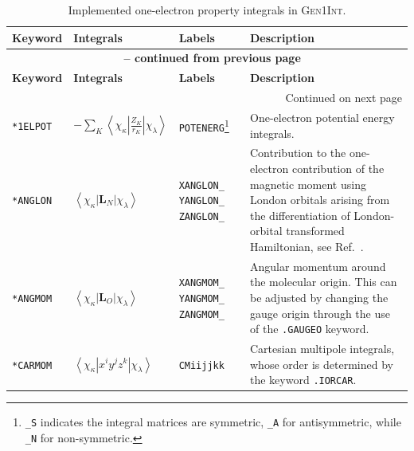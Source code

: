 \documentclass[a4paper,11pt,twoside,openright]{book}
\newcommand{\propint}[1]{\left\langle\chi_{\kappa}\left|#1\right|\chi_{\lambda}\right\rangle}
\begin{document}
\begin{landscape}

\begin{center}

\begin{longtable}{p{1.8cm}|p{6.5cm}|p{2.2cm}|p{11cm}}
  \caption{Implemented one-electron property integrals in \textsc{Gen1Int}.}
  \label{tab:def-prop}\\
  \hline\hline
  \textbf{Keyword} & \textbf{Integrals} & \textbf{Labels} & \textbf{Description}\\
  \hline
  \endfirsthead
%
  \multicolumn{4}{c}{{\bfseries\tablename~\thetable{} -- continued from previous page}}\\
  \hline\hline
  \textbf{Keyword} & \textbf{Integrals} & \textbf{Labels} & \textbf{Description}\\
  \hline
  \endhead
%
  \hline
  \multicolumn{4}{r}{{Continued on next page}}\\
  \hline
  \endfoot
%
  \hline\hline
  \endlastfoot
%
  \texttt{*1ELPOT}
  & $-\sum_K\propint{\frac{Z_K}{r_K}}$
  & \verb|POTENERG|\footnote{\texttt{\_S} indicates the integral matrices are symmetric, %
     \texttt{\_A} for antisymmetric, while \texttt{\_N} for non-symmetric.}
  & One-electron potential energy integrals.\\
  \hline
%
  \texttt{*ANGLON}
  & $\propint{\mathbf{L}_N}$
  & \verb|XANGLON_| \verb|YANGLON_| \verb|ZANGLON_|
  & Contribution to the one-electron contribution of the magnetic
      moment using London orbitals arising from the differentiation of
      London-orbital transformed Hamiltonian, see Ref.~\cite{thpjjcp95}.\\
  \hline
%
  \texttt{*ANGMOM}
  & $\propint{\mathbf{L}_O}$
  & \verb|XANGMOM_| \verb|YANGMOM_| \verb|ZANGMOM_|
  & Angular momentum around the molecular origin. This can be adjusted
     by changing the gauge origin through the use of the \texttt{.GAUGEO} keyword.\\
  \hline
%
  \texttt{*CARMOM}
  & $\propint{x^{i}y^{j}z^{k}}$
  & \verb|CMiijjkk|
  & Cartesian multipole integrals, whose order is determined by the keyword \texttt{.IORCAR}.


\end{longtable}
\end{center}
\end{landscape}
\end{document}
